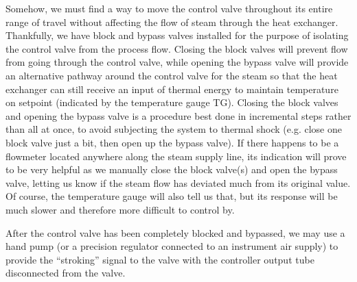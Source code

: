 
Somehow, we must find a way to move the control valve throughout its entire range of travel without affecting the flow of steam through the heat exchanger.  Thankfully, we have block and bypass valves installed for the purpose of isolating the control valve from the process flow.  Closing the block valves will prevent flow from going through the control valve, while opening the bypass valve will provide an alternative pathway around the control valve for the steam so that the heat exchanger can still receive an input of thermal energy to maintain temperature on setpoint (indicated by the temperature gauge TG).  Closing the block valves and opening the bypass valve is a procedure best done in incremental steps rather than all at once, to avoid subjecting the system to thermal shock (e.g. close one block valve just a bit, then open up the bypass valve).  If there happens to be a flowmeter located anywhere along the steam supply line, its indication will prove to be very helpful as we manually close the block valve(s) and open the bypass valve, letting us know if the steam flow has deviated much from its original value.  Of course, the temperature gauge will also tell us that, but its response will be much slower and therefore more difficult to control by.

\vskip 10pt

After the control valve has been completely blocked and bypassed, we may use a hand pump (or a precision regulator connected to an instrument air supply) to provide the ``stroking'' signal to the valve with the controller output tube disconnected from the valve.




